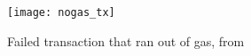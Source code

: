 \begin{figure}[H]
    \centering
    \texttt{[image: nogas\_tx]}
    \caption{Failed transaction that ran out of gas, from \cite{preethi}}
    \label{fig:nogas_tx}
\end{figure}